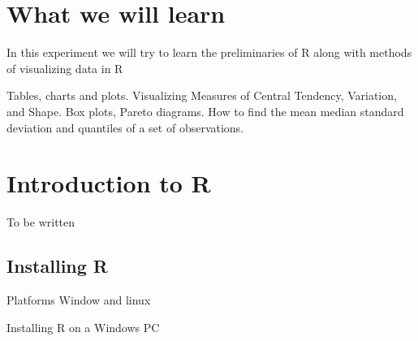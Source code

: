 \documentclass["../Applied_probabillity _and_statistics_lab_KTU.tex"]{subfiles}
\begin{document}
\section*{What we will learn}
In this experiment we will try to  learn the preliminaries of R along with methods of visualizing data in R

Tables, charts and plots. Visualizing Measures of Central Tendency, Variation,
and Shape. Box plots, Pareto diagrams. How to find the mean median standard
deviation and quantiles of a set of observations.




\section{Introduction to R}
To be written 
\subsection{Installing R }
  Platforms Window and linux
  
  Installing R on a Windows PC
\end{document}
